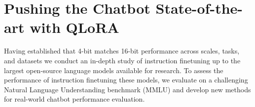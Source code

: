 \begin{table}[]
\centering
\caption{Mean 5-shot MMLU test accuracy for LLaMA 7-65B models finetuned with adapters on Alpaca and FLAN v2 for different data types. Overall, NF4 with double quantization (DQ) matches BFloat16 performance, while FP4 is consistently one percentage point behind both.}
\label{tbl:llama-datatype}
\end{table}

\section{Pushing the Chatbot State-of-the-art with QLoRA}
\label{sec:pushing}
Having established that 4-bit \method matches 16-bit performance across scales, tasks, and datasets we conduct an in-depth study of instruction finetuning up to the largest open-source language models available for research. To assess the performance of instruction finetuning these models, we evaluate on a challenging Natural Language Understanding benchmark (MMLU) and develop new methods for real-world  chatbot performance evaluation. 






